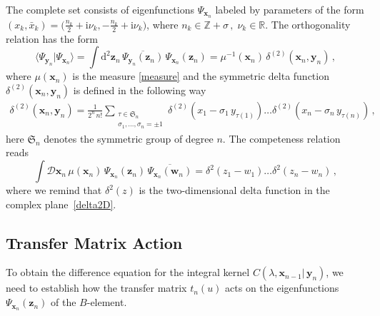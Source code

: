 \documentclass[a4paper,11pt]{article}
\renewcommand{\imath}{\mathrm{i}}
\numberwithin{equation}{section}
\begin{document}
The complete set consists of eigenfunctions $\Psi_{\bm{x}_n}$ labeled by parameters of the form $(x_k, \bar{x}_k) = \bigl(\tfrac{n_k}{2}+\imath\nu_k, -\tfrac{n_k}{2}+\imath\nu_k\bigr)$, where $n_k \in \mathbb{Z}+\sigma \,, \; \nu_k \in \mathbb{R}$.
The orthogonality relation has the form
\begin{equation} \label{orth}
	\langle\Psi_{\bm{y}_n}|\Psi_{\bm{x}_n}\rangle = 
\int \mathrm{d}^2\bm{z}_n \, 
\overline{\Psi_{\bm{y}_n}(\bm{z}_n)} \, \Psi_{\bm{x}_n}(\bm{z}_n) = 
	\mu^{-1}(\bm{x}_n)\, \delta^{(2)}(\bm{x}_n,\bm{y}_n) \,,
\end{equation}
where $\mu(\bm{x}_n)$ is the measure \eqref{measure} and the symmetric delta function $\delta^{(2)}(\bm{x}_n,\bm{y}_n)$ is 
defined in the following way
\begin{align}\nonumber
	\delta^{(2)}(\bm{x}_n,\bm{y}_n) =
	\frac{1}{2^n\,n!}
	\sum\limits_{
		\begin{smallmatrix}
			\tau\in \mathfrak{S}_n \\ \sigma_1,\ldots,\sigma_n=\pm 1
	\end{smallmatrix}}
	\delta^{(2)}(x_1-\sigma_1\,y_{\tau(1)}) \ldots
	\delta^{(2)}(x_n-\sigma_n\,y_{\tau(n)}) \,,
\end{align}
here $\mathfrak{S}_n$ denotes the symmetric group of degree $n$. The competeness relation reads
\begin{equation} \nonumber
	\int \mathcal{D}\bm{x}_n \, \mu(\bm{x}_n) \,
	\Psi_{\bm{x}_n}(\bm{z}_n) \, \overline{\Psi_{\bm{x}_n}(\bm{w}_n)} =
	\delta^2(z_1-w_1) \ldots \delta^2(z_n-w_n) \,,
\end{equation}
where we remind that $\delta^2(z)$ is the two-dimensional delta function in the complex plane~\eqref{delta2D}.


\subsection{Transfer Matrix Action}

To obtain the difference equation for the integral kernel $C(\lambda, \bm{x}_{n-1}|\,\bm{y}_n)$, we need to establish how the transfer matrix $t_n(u)$ acts on the eigenfunctions $\Psi_{\bm{x}_n}(\bm{z}_n)$ of the $B$-element.
\end{document}
